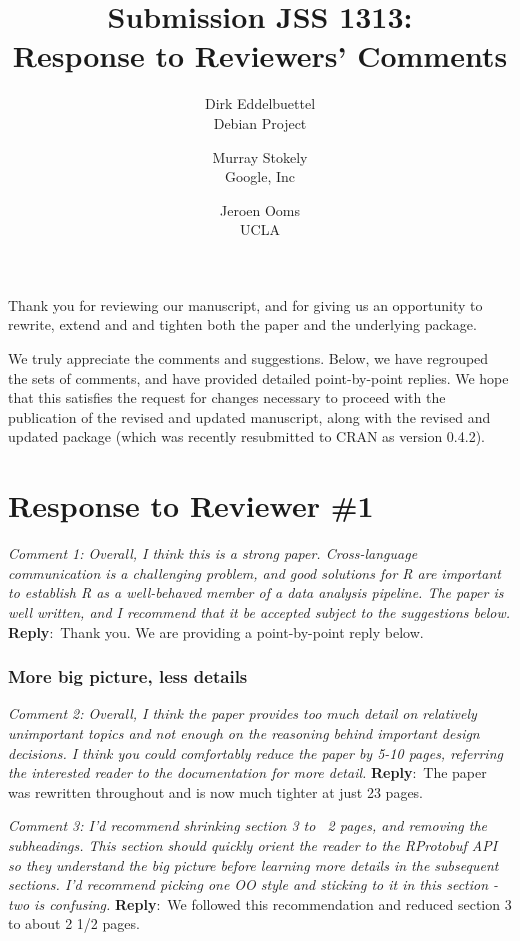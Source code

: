 \documentclass[10pt]{article}
\newcommand{\pointRaised}[2]{\smallskip %
  \textsl{{\fontseries{b}\selectfont #1}: #2}\newline}
\newcommand{\reply}[1]{\textbf{Reply}:\ #1 \smallskip } %
\begin{document}
\author{Dirk Eddelbuettel\\Debian Project \and 
        Murray Stokely\\Google, Inc \and
        Jeroen Ooms\\UCLA}
\title{Submission JSS 1313: \\ Response to Reviewers' Comments}
\maketitle 
\thispagestyle{empty}

Thank you for reviewing our manuscript, and for giving us an opportunity to
rewrite, extend and and tighten both the paper and the underlying package.

\smallskip
We truly appreciate the comments and suggestions. Below, we have regrouped the sets
of comments, and have provided detailed point-by-point replies.
%
We hope that this satisfies the request for changes necessary to proceed with
the publication of the revised and updated manuscript, along with the revised
and updated package (which was recently resubmitted to CRAN as version 0.4.2).

\section*{Response to Reviewer \#1}

\pointRaised{Comment 1}{Overall, I think this is a strong paper. Cross-language communication
  is a challenging problem, and good solutions for R are important to
  establish R as a well-behaved member of a data analysis pipeline. The
  paper is well written, and I recommend that it be accepted subject to
  the suggestions below.}
\reply{Thank you. We are providing a point-by-point reply below.}

\subsubsection*{More big picture, less details}

\pointRaised{Comment 2}{Overall, I think the paper provides too much detail on
  relatively unimportant topics and not enough on the reasoning behind
  important design decisions. I think you could comfortably reduce the paper
  by 5-10 pages, referring the interested reader to the documentation for
  more detail.}
\reply{The paper was rewritten throughout and is now much tighter at just 23 pages.}

\pointRaised{Comment 3}{I'd recommend shrinking section 3 to ~2 pages, and removing the
  subheadings. This section should quickly orient the reader to the
  RProtobuf API so they understand the big picture before learning more
  details in the subsequent sections. I'd recommend picking one OO style
  and sticking to it in this section - two is confusing.}
\reply{We followed this recommendation and reduced section 3 to about 2 1/2 pages.}
\end{document}
